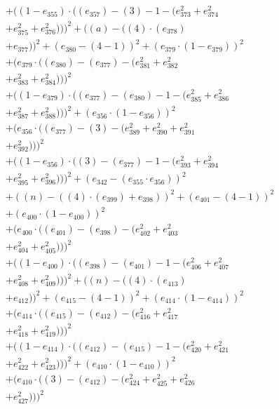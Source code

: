 \documentclass[10pt, a4paper]{article}
\begin{document}
\begin{align*}
& + ((1 - e_{355})  \cdot  ((e_{357}) - (3) - 1 - (e_{373}^{2} + e_{374}^{2} \\
& + e_{375}^{2} + e_{376}^{2})))^{2} + ((a) - ((4)  \cdot  (e_{378}) \\
& + e_{377}))^{2} + (e_{380} - (4 - 1))^{2} + (e_{379}  \cdot  (1 - e_{379}))^{2} \\
& + (e_{379}  \cdot  ((e_{380}) - (e_{377}) - (e_{381}^{2} + e_{382}^{2} \\
& + e_{383}^{2} + e_{384}^{2})))^{2} \\
& + ((1 - e_{379})  \cdot  ((e_{377}) - (e_{380}) - 1 - (e_{385}^{2} + e_{386}^{2} \\
& + e_{387}^{2} + e_{388}^{2})))^{2} + (e_{356}  \cdot  (1 - e_{356}))^{2} \\
& + (e_{356}  \cdot  ((e_{377}) - (3) - (e_{389}^{2} + e_{390}^{2} + e_{391}^{2} \\
& + e_{392}^{2})))^{2} \\
& + ((1 - e_{356})  \cdot  ((3) - (e_{377}) - 1 - (e_{393}^{2} + e_{394}^{2} \\
& + e_{395}^{2} + e_{396}^{2})))^{2} + (e_{342} - (e_{355}  \cdot  e_{356}))^{2} \\
& + ((n) - ((4)  \cdot  (e_{399}) + e_{398}))^{2} + (e_{401} - (4 - 1))^{2} \\
& + (e_{400}  \cdot  (1 - e_{400}))^{2} \\
& + (e_{400}  \cdot  ((e_{401}) - (e_{398}) - (e_{402}^{2} + e_{403}^{2} \\
& + e_{404}^{2} + e_{405}^{2})))^{2} \\
& + ((1 - e_{400})  \cdot  ((e_{398}) - (e_{401}) - 1 - (e_{406}^{2} + e_{407}^{2} \\
& + e_{408}^{2} + e_{409}^{2})))^{2} + ((n) - ((4)  \cdot  (e_{413}) \\
& + e_{412}))^{2} + (e_{415} - (4 - 1))^{2} + (e_{414}  \cdot  (1 - e_{414}))^{2} \\
& + (e_{414}  \cdot  ((e_{415}) - (e_{412}) - (e_{416}^{2} + e_{417}^{2} \\
& + e_{418}^{2} + e_{419}^{2})))^{2} \\
& + ((1 - e_{414})  \cdot  ((e_{412}) - (e_{415}) - 1 - (e_{420}^{2} + e_{421}^{2} \\
& + e_{422}^{2} + e_{423}^{2})))^{2} + (e_{410}  \cdot  (1 - e_{410}))^{2} \\
& + (e_{410}  \cdot  ((3) - (e_{412}) - (e_{424}^{2} + e_{425}^{2} + e_{426}^{2} \\
& + e_{427}^{2})))^{2} \\

\end{align*}
\end{document}
